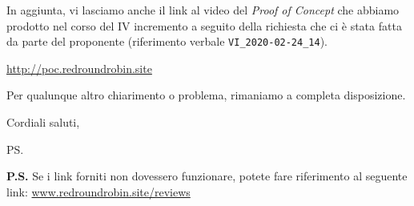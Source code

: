 \documentclass[12pt]{letter}
\begin{document}
\begin{letter}{ }
In aggiunta, vi lasciamo anche il link al video del \textit{Proof of Concept} che abbiamo prodotto nel corso del IV incremento a seguito della richiesta che ci è stata fatta da parte del proponente (riferimento verbale \verb!VI_2020-02-24_14!).

\begin{center}
	\href{http://poc.redroundrobin.site/}{http://poc.redroundrobin.site}
\end{center}


Per qualunque altro chiarimento o problema, rimaniamo a completa disposizione.

\closing{Cordiali saluti,}


\vspace{3em}
\ps

\textbf{P.S.} Se i link forniti non dovessero funzionare, potete fare riferimento al seguente link:
\href{https://www.redroundrobin.site/reviews}{www.redroundrobin.site/reviews}

\end{letter}
\end{document}
